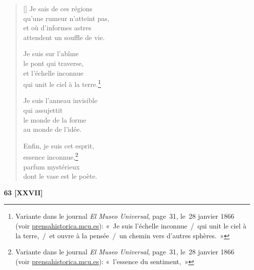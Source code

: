 \documentclass[a4paper,12pt]{book}
\begin{document}
\begin{verse}[\versewidth]
  Je sais de ces régions \\
  qu'une rumeur n'atteint pas, \\
  et où d'informes astres \\
  attendent un souffle de vie.

  Je suis sur l'abîme \\
  le pont qui traverse, \\
  et l'échelle inconnue \\
  qui unit le ciel à la terre.\footnote{Variante dans le journal
  \emph{El Museo Universal}, page~31, le~28 janvier 1866 (voir
  \url{prensahistorica.mcu.es}): «~Je suis l'échelle inconnue~/~qui unit
  le ciel à la terre,~/~et ouvre à la pensée~/~un chemin vers d'autres
  sphères.~»}

  Je suis l'anneau invisible \\
  qui assujettit \\
  le monde de la forme \\
  au monde de l'idée.

  Enfin, je suis cet esprit, \\
  essence inconnue,\footnote{Variante dans le journal
  \emph{El Museo Universal}, page~31, le~28 janvier 1866 (voir
  \url{prensahistorica.mcu.es}): «~l'essence du sentiment,~»} \\
  parfum mystérieux \\
  dont le vase est le poète.
\end{verse}

\bigskip

\begin{center}
  \textbf{63 [XXVII]}
\end{center}

\settowidth{\versewidth}{Éveillée, tu regardes et, en regardant, tes yeux}
\end{document}
